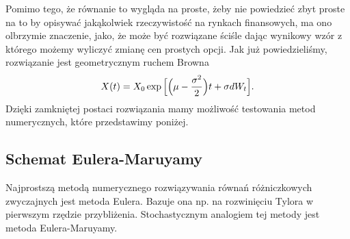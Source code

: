 \documentclass[a4paper,12pt,polish]{sphinxmanual}
\begin{document}
Pomimo tego, że równanie to wygląda na proste, żeby nie powiedzieć zbyt proste na to by opisywać jakąkolwiek
rzeczywistość na rynkach finansowych, ma ono olbrzymie znaczenie, jako, że może być rozwiązane ściśle
dając wynikowy wzór z którego możemy wyliczyć zmianę cen prostych opcji. Jak już powiedzieliśmy,
rozwiązanie jest geometrycznym ruchem Browna
\begin{gather}
\begin{split}X(t) = X_0 \exp \Big[ \Big( \mu - \frac{\sigma^2}{2} \Big) t + \sigma dW_t \Big].\end{split}\notag
\end{gather}
Dzięki zamkniętej postaci rozwiązania mamy możliwość testowania metod numerycznych, które przedstawimy
poniżej.


\subsection{Schemat Eulera-Maruyamy}
\label{ch5/chV013:schemat-eulera-maruyamy}
Najprostszą metodą numerycznego rozwiązywania równań różniczkowych zwyczajnych jest metoda Eulera. Bazuje
ona np. na rozwinięciu Tylora w pierwszym rzędzie przybliżenia. Stochastycznym analogiem tej metody
jest metoda Eulera-Maruyamy.
\end{document}
